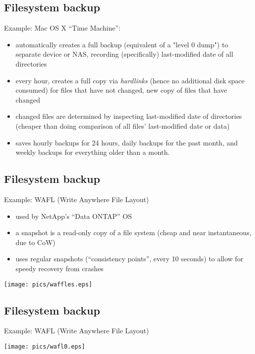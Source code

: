 \documentclass[xga]{xdvislides}
\begin{document}
\subsection{Filesystem backup}
Example: Mac OS X ``Time Machine'':
\begin{itemize}
	\item automatically creates a full backup (equivalent of a "level 0 dump")
		to separate device or NAS, recording (specifically) last-modified date
		of all directories
	\item every hour, creates a full copy via {\em hardlinks} (hence no
		additional disk space consumed) for files that have not changed,
		new copy of files that have changed
		\item changed files are determined by inspecting last-modified date of
			directories (cheaper than doing comparison of all files'
			last-modified date or data)
	\item saves hourly backups for 24 hours, daily backups for
		the past month, and weekly backups for everything older than a month.
\end{itemize}

\subsection{Filesystem backup}
Example: WAFL (Write Anywhere File Layout)
\begin{itemize}
	\item used by NetApp's ``Data ONTAP'' OS
	\item a snapshot is a read-only copy of a file system (cheap and near
		instantaneous, due to CoW)
	\item uses regular snapshots (``consistency points'', every 10 seconds)
		to allow for speedy recovery from crashes
\end{itemize}
\vspace*{\fill}
\begin{center}
	\texttt{[image: pics/waffles.eps]}
\end{center}
\vspace*{\fill}


\subsection{Filesystem backup}
Example: WAFL (Write Anywhere File Layout)
\vspace*{\fill}
\begin{center}
	\texttt{[image: pics/wafl0.eps]}
\end{center}
\vspace*{\fill}
\end{document}
